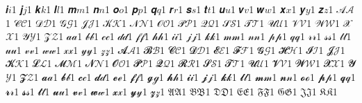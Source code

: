 {𝒊}{{\(\bm{{\mathit{i}}}\)}}1 {𝒋}{{\(\bm{{\mathit{j}}}\)}}1 {𝒌}{{\(\bm{{\mathit{k}}}\)}}1 {𝒍}{{\(\bm{{\mathit{l}}}\)}}1 {𝒎}{{\(\bm{{\mathit{m}}}\)}}1 {𝒏}{{\(\bm{{\mathit{n}}}\)}}1 {𝒐}{{\(\bm{{\mathit{o}}}\)}}1 {𝒑}{{\(\bm{{\mathit{p}}}\)}}1 {𝒒}{{\(\bm{{\mathit{q}}}\)}}1 {𝒓}{{\(\bm{{\mathit{r}}}\)}}1 {𝒔}{{\(\bm{{\mathit{s}}}\)}}1 {𝒕}{{\(\bm{{\mathit{t}}}\)}}1 {𝒖}{{\(\bm{{\mathit{u}}}\)}}1 {𝒗}{{\(\bm{{\mathit{v}}}\)}}1 {𝒘}{{\(\bm{{\mathit{w}}}\)}}1 {𝒙}{{\(\bm{{\mathit{x}}}\)}}1 {𝒚}{{\(\bm{{\mathit{y}}}\)}}1 {𝒛}{{\(\bm{{\mathit{z}}}\)}}1 {𝒜}{{\(\mathcal{A}\)}}1 {𝒞}{{\(\mathcal{C}\)}}1 {𝒟}{{\(\mathcal{D}\)}}1 {𝒢}{{\(\mathcal{G}\)}}1 {𝒥}{{\(\mathcal{J}\)}}1 {𝒦}{{\(\mathcal{K}\)}}1 {𝒩}{{\(\mathcal{N}\)}}1 {𝒪}{{\(\mathcal{O}\)}}1 {𝒫}{{\(\mathcal{P}\)}}1 {𝒬}{{\(\mathcal{Q}\)}}1 {𝒮}{{\(\mathcal{S}\)}}1 {𝒯}{{\(\mathcal{T}\)}}1 {𝒰}{{\(\mathcal{U}\)}}1 {𝒱}{{\(\mathcal{V}\)}}1 {𝒲}{{\(\mathcal{W}\)}}1 {𝒳}{{\(\mathcal{X}\)}}1 {𝒴}{{\(\mathcal{Y}\)}}1 {𝒵}{{\(\mathcal{Z}\)}}1 {𝒶}{{\(\mathcal{a}\)}}1 {𝒷}{{\(\mathcal{b}\)}}1 {𝒸}{{\(\mathcal{c}\)}}1 {𝒹}{{\(\mathcal{d}\)}}1 {𝒻}{{\(\mathcal{f}\)}}1 {𝒽}{{\(\mathcal{h}\)}}1 {𝒾}{{\(\mathcal{i}\)}}1 {𝒿}{{\(\mathcal{j}\)}}1 {𝓀}{{\(\mathcal{k}\)}}1 {𝓂}{{\(\mathcal{m}\)}}1 {𝓃}{{\(\mathcal{n}\)}}1 {𝓅}{{\(\mathcal{p}\)}}1 {𝓆}{{\(\mathcal{q}\)}}1 {𝓇}{{\(\mathcal{r}\)}}1 {𝓈}{{\(\mathcal{s}\)}}1 {𝓉}{{\(\mathcal{t}\)}}1 {𝓊}{{\(\mathcal{u}\)}}1 {𝓋}{{\(\mathcal{v}\)}}1 {𝓌}{{\(\mathcal{w}\)}}1 {𝓍}{{\(\mathcal{x}\)}}1 {𝓎}{{\(\mathcal{y}\)}}1 {𝓏}{{\(\mathcal{z}\)}}1 {𝓐}{{\(\bm{{\mathcal{A}}}\)}}1 {𝓑}{{\(\bm{{\mathcal{B}}}\)}}1 {𝓒}{{\(\bm{{\mathcal{C}}}\)}}1 {𝓓}{{\(\bm{{\mathcal{D}}}\)}}1 {𝓔}{{\(\bm{{\mathcal{E}}}\)}}1 {𝓕}{{\(\bm{{\mathcal{F}}}\)}}1 {𝓖}{{\(\bm{{\mathcal{G}}}\)}}1 {𝓗}{{\(\bm{{\mathcal{H}}}\)}}1 {𝓘}{{\(\bm{{\mathcal{I}}}\)}}1 {𝓙}{{\(\bm{{\mathcal{J}}}\)}}1 {𝓚}{{\(\bm{{\mathcal{K}}}\)}}1 {𝓛}{{\(\bm{{\mathcal{L}}}\)}}1 {𝓜}{{\(\bm{{\mathcal{M}}}\)}}1 {𝓝}{{\(\bm{{\mathcal{N}}}\)}}1 {𝓞}{{\(\bm{{\mathcal{O}}}\)}}1 {𝓟}{{\(\bm{{\mathcal{P}}}\)}}1 {𝓠}{{\(\bm{{\mathcal{Q}}}\)}}1 {𝓡}{{\(\bm{{\mathcal{R}}}\)}}1 {𝓢}{{\(\bm{{\mathcal{S}}}\)}}1 {𝓣}{{\(\bm{{\mathcal{T}}}\)}}1 {𝓤}{{\(\bm{{\mathcal{U}}}\)}}1 {𝓥}{{\(\bm{{\mathcal{V}}}\)}}1 {𝓦}{{\(\bm{{\mathcal{W}}}\)}}1 {𝓧}{{\(\bm{{\mathcal{X}}}\)}}1 {𝓨}{{\(\bm{{\mathcal{Y}}}\)}}1 {𝓩}{{\(\bm{{\mathcal{Z}}}\)}}1 {𝓪}{{\(\bm{{\mathcal{a}}}\)}}1 {𝓫}{{\(\bm{{\mathcal{b}}}\)}}1 {𝓬}{{\(\bm{{\mathcal{c}}}\)}}1 {𝓭}{{\(\bm{{\mathcal{d}}}\)}}1 {𝓮}{{\(\bm{{\mathcal{e}}}\)}}1 {𝓯}{{\(\bm{{\mathcal{f}}}\)}}1 {𝓰}{{\(\bm{{\mathcal{g}}}\)}}1 {𝓱}{{\(\bm{{\mathcal{h}}}\)}}1 {𝓲}{{\(\bm{{\mathcal{i}}}\)}}1 {𝓳}{{\(\bm{{\mathcal{j}}}\)}}1 {𝓴}{{\(\bm{{\mathcal{k}}}\)}}1 {𝓵}{{\(\bm{{\mathcal{l}}}\)}}1 {𝓶}{{\(\bm{{\mathcal{m}}}\)}}1 {𝓷}{{\(\bm{{\mathcal{n}}}\)}}1 {𝓸}{{\(\bm{{\mathcal{o}}}\)}}1 {𝓹}{{\(\bm{{\mathcal{p}}}\)}}1 {𝓺}{{\(\bm{{\mathcal{q}}}\)}}1 {𝓻}{{\(\bm{{\mathcal{r}}}\)}}1 {𝓼}{{\(\bm{{\mathcal{s}}}\)}}1 {𝓽}{{\(\bm{{\mathcal{t}}}\)}}1 {𝓾}{{\(\bm{{\mathcal{u}}}\)}}1 {𝓿}{{\(\bm{{\mathcal{v}}}\)}}1 {𝔀}{{\(\bm{{\mathcal{w}}}\)}}1 {𝔁}{{\(\bm{{\mathcal{x}}}\)}}1 {𝔂}{{\(\bm{{\mathcal{y}}}\)}}1 {𝔃}{{\(\bm{{\mathcal{z}}}\)}}1 {𝔄}{{\(\mathfrak{A}\)}}1 {𝔅}{{\(\mathfrak{B}\)}}1 {𝔇}{{\(\mathfrak{D}\)}}1 {𝔈}{{\(\mathfrak{E}\)}}1 {𝔉}{{\(\mathfrak{F}\)}}1 {𝔊}{{\(\mathfrak{G}\)}}1 {𝔍}{{\(\mathfrak{J}\)}}1 {𝔎}{{\(\mathfrak{K}\)}}1 